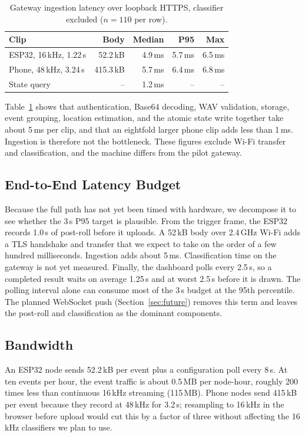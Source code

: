 \documentclass[conference]{IEEEtran}
\newcommand{\ms}{\,ms}
\begin{document}
\begin{table}[!t]
\centering
\caption{Gateway ingestion latency over loopback HTTPS, classifier excluded ($n = 110$ per row).}
\label{tab:latency}
\renewcommand{\arraystretch}{1.1}
\footnotesize
\begin{tabular}{@{}l r r r r@{}}
\toprule
\textbf{Clip} & \textbf{Body} & \textbf{Median} & \textbf{P95} & \textbf{Max} \\
\midrule
ESP32, 16\,kHz, 1.22\,s & 52.2\,kB & 4.9\ms & 5.7\ms & 6.5\ms \\
Phone, 48\,kHz, 3.24\,s & 415.3\,kB & 5.7\ms & 6.4\ms & 6.8\ms \\
State query & -- & 1.2\ms & -- & -- \\
\bottomrule
\end{tabular}
\end{table}

Table~\ref{tab:latency} shows that authentication, Base64 decoding, WAV validation, storage, event grouping, location estimation, and the atomic state write together take about 5\ms{} per clip, and that an eightfold larger phone clip adds less than 1\ms. Ingestion is therefore not the bottleneck. These figures exclude Wi-Fi transfer and classification, and the machine differs from the pilot gateway.

\subsection{End-to-End Latency Budget}
Because the full path has not yet been timed with hardware, we decompose it to see whether the 3\,s P95 target is plausible. From the trigger frame, the ESP32 records 1.0\,s of post-roll before it uploads. A 52\,kB body over 2.4\,GHz Wi-Fi adds a TLS handshake and transfer that we expect to take on the order of a few hundred milliseconds. Ingestion adds about 5\ms. Classification time on the gateway is not yet measured. Finally, the dashboard polls every 2.5\,s, so a completed result waits on average 1.25\,s and at worst 2.5\,s before it is drawn. The polling interval alone can consume most of the 3\,s budget at the 95th percentile. The planned WebSocket push (Section~\ref{sec:future}) removes this term and leaves the post-roll and classification as the dominant components.

\subsection{Bandwidth}
An ESP32 node sends 52.2\,kB per event plus a configuration poll every 8\,s. At ten events per hour, the event traffic is about 0.5\,MB per node-hour, roughly 200 times less than continuous 16\,kHz streaming (115\,MB). Phone nodes send 415\,kB per event because they record at 48\,kHz for 3.2\,s; resampling to 16\,kHz in the browser before upload would cut this by a factor of three without affecting the 16\,kHz classifiers we plan to use.
\end{document}
